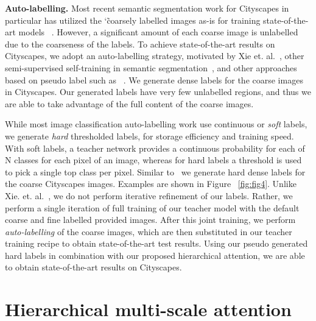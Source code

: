 \documentclass{article}
\begin{document}
\textbf{Auto-labelling.} Most recent semantic segmentation work for Cityscapes in particular has utilized the \char`\~ coarsely labelled images as-is for training state-of-the-art models ~\cite{yuan2018ocnet, semantic_cvpr19}. However, a significant amount of each coarse image is unlabelled due to the coarseness of the labels. To achieve state-of-the-art results on Cityscapes, we adopt an auto-labelling strategy, motivated by Xie et. al.~\cite{xie2019selftraining}, other semi-supervised self-training in semantic segmentation~\cite{Lian_2019_Pyramid,Li_2019_bidirection,Luc2017futureSeg,Zou2018DAClassBalance,Zou_2019_CRST}, and other approaches based on pseudo label such as ~\cite{lee2013pseudo,iscen2019label,shi2018transductive,arazo2019pseudo}. We generate dense labels for the coarse images in Cityscapes. Our generated labels have very few unlabelled regions, and thus we are able to take advantage of the full content of the coarse images.

While most image classification auto-labelling work use continuous or \textit{soft} labels, we generate \textit{hard} thresholded labels, for storage efficiency and training speed. With soft labels, a teacher network provides a continuous probability for each of N classes for each pixel of an image, whereas for hard labels a threshold is used to pick a single top class per pixel. Similar to~\cite{li2019decoupled,lee2013pseudo} we generate hard dense labels for the coarse Cityscapes images. Examples are shown in Figure ~\ref{fig:fig4}. Unlike Xie. et. al.~\cite{xie2019selftraining}, we do not perform iterative refinement of our labels. Rather, we perform a single iteration of full training of our teacher model with the default coarse and fine labelled provided images. After this joint training, we perform \emph{auto-labelling} of the coarse images, which are then substituted in our teacher training recipe to obtain state-of-the-art test results. Using our pseudo generated hard labels in combination with our proposed hierarchical attention, we are able to obtain state-of-the-art results on Cityscapes.

\section{Hierarchical multi-scale attention}
\label{sec:headings}
\end{document}
